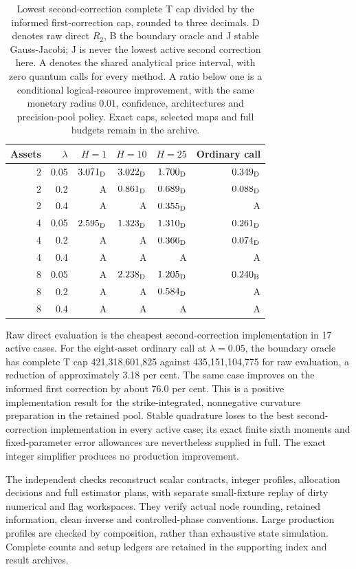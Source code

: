 \documentclass[11pt]{article}
\begin{document}
\begin{table}[ht]
\centering\small
\begin{tabular}{rrrrrr}
\toprule
Assets&$\lambda$&$H=1$&$H=10$&$H=25$&Ordinary call\\
\midrule
2&0.05&$3.071_{\rm D}$&$3.022_{\rm D}$&$1.700_{\rm D}$&$0.349_{\rm D}$\\
2&0.2&A&$0.861_{\rm D}$&$0.689_{\rm D}$&$0.088_{\rm D}$\\
2&0.4&A&A&$0.355_{\rm D}$&A\\
4&0.05&$2.595_{\rm D}$&$1.323_{\rm D}$&$1.310_{\rm D}$&$0.261_{\rm D}$\\
4&0.2&A&A&$0.366_{\rm D}$&$0.074_{\rm D}$\\
4&0.4&A&A&A&A\\
8&0.05&A&$2.238_{\rm D}$&$1.205_{\rm D}$&$0.240_{\rm B}$\\
8&0.2&A&A&$0.584_{\rm D}$&A\\
8&0.4&A&A&A&A\\
\bottomrule
\end{tabular}
\caption{Lowest second-correction complete T cap divided by the informed
first-correction cap, rounded to three decimals. D denotes raw direct
$R_2$, B the boundary oracle and J stable Gauss-Jacobi; J is never the
lowest active second correction here. A denotes the shared analytical
price interval, with zero quantum calls for every method. A ratio below
one is a conditional logical-resource improvement, with the same monetary
radius $0.01$, confidence, architectures and precision-pool policy.
Exact caps, selected maps and full budgets remain in the archive.}
\label{tab:n2}
\end{table}

Raw direct evaluation is the cheapest second-correction implementation
in 17 active cases. For the eight-asset ordinary call at $\lambda=0.05$,
the boundary oracle has complete T cap 421,318,601,825 against
435,151,104,775 for raw evaluation, a reduction of approximately
3.18 per cent. The same case improves on the informed first correction
by about 76.0 per cent. This is a positive implementation result for
the strike-integrated, nonnegative curvature preparation in the retained
pool. Stable quadrature loses to the best second-correction implementation
in every active case; its exact finite sixth moments and fixed-parameter
error allowances are nevertheless supplied in full. The exact integer
simplifier produces no production improvement.

The independent checks reconstruct scalar contracts, integer profiles,
allocation decisions and full estimator plans, with separate small-fixture
replay of dirty numerical and flag workspaces. They verify actual node
rounding, retained information, clean inverse and controlled-phase
conventions. Large production profiles are checked by composition, rather
than exhaustive state simulation. Complete counts and setup ledgers are
retained in the supporting index and result archives.
\end{document}
